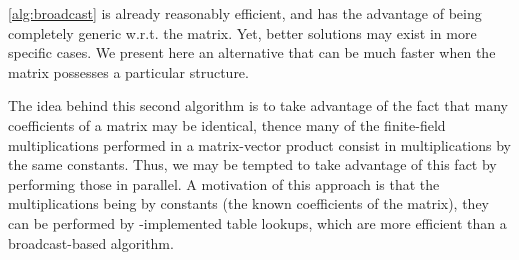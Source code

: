\autoref{alg:broadcast} is already reasonably efficient, and has the
advantage of being completely generic w.r.t. the matrix. Yet, better solutions may exist in more specific cases.
We present here an alternative that can be much faster when the matrix possesses a particular structure.

The idea behind this second algorithm is to take advantage of the fact that many coefficients of a matrix may be identical, thence many of the finite-field multiplications performed in
a matrix-vector product consist in multiplications by the same constants. Thus, we may be tempted
to take advantage of this fact by performing those in parallel.
A motivation of this approach is that the multiplications being by constants
(the known coefficients of the matrix), they can be
performed by \pshufb-implemented table lookups, which are more efficient than
a broadcast-based algorithm.

